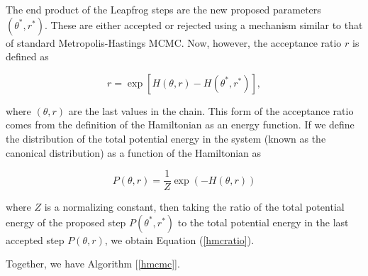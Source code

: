     The end product of the Leapfrog steps are the new proposed parameters $(\theta^*,r^*)$. These are either accepted or rejected using a mechanism similar to that of standard Metropolis-Hastings MCMC. Now, however, the acceptance ratio $r$ is defined as

    \begin{equation}\label{hmcratio}
        r = \exp \left[ H(\theta,r) - H(\theta^*,r^*) \right],
    \end{equation}

    where $(\theta,r)$ are the last values in the chain. This form of the acceptance ratio comes from the definition of the Hamiltonian as an energy function. If we define the distribution of the total potential energy in the system (known as the canonical distribution) as a function of the Hamiltonian as

    \begin{equation}
    	P(\theta,r) = \frac{1}{Z} \exp (-H(\theta,r))
    \end{equation}

    where $Z$ is a normalizing constant, then taking the ratio of the total potential energy of the proposed step $P(\theta^*,r^*)$ to the total potential energy in the last accepted step $P(\theta, r)$, we obtain Equation (\ref{hmcratio}).

    Together, we have Algorithm [\ref{hmcmc}].

